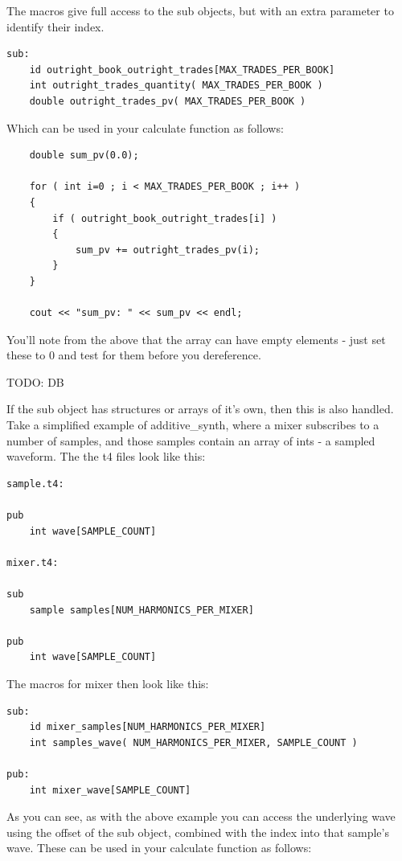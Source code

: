 \documentclass{report}
\begin{document}
The macros give full access to the sub objects, but with an extra parameter to identify their index.

\begin{verbatim}
sub:
    id outright_book_outright_trades[MAX_TRADES_PER_BOOK]
    int outright_trades_quantity( MAX_TRADES_PER_BOOK )
    double outright_trades_pv( MAX_TRADES_PER_BOOK )
\end{verbatim}

Which can be used in your calculate function as follows:

\begin{verbatim}
    double sum_pv(0.0);
    
    for ( int i=0 ; i < MAX_TRADES_PER_BOOK ; i++ )
    {
        if ( outright_book_outright_trades[i] )
        {
            sum_pv += outright_trades_pv(i);
        }
    }

    cout << "sum_pv: " << sum_pv << endl;
\end{verbatim}

You'll note from the above that the array can have empty elements - just set these to 0 and test for them before you dereference.

TODO: DB

If the sub object has structures or arrays of it's own, then this is also handled. Take a simplified example of additive_synth, where a mixer subscribes to a number of samples, and those samples contain an array of ints - a sampled waveform. The the t4 files look like this:


\begin{verbatim}
sample.t4:

pub
    int wave[SAMPLE_COUNT]

mixer.t4:

sub
    sample samples[NUM_HARMONICS_PER_MIXER]

pub
    int wave[SAMPLE_COUNT]
\end{verbatim}

The macros for mixer then look like this:

\begin{verbatim}
sub:
    id mixer_samples[NUM_HARMONICS_PER_MIXER]
    int samples_wave( NUM_HARMONICS_PER_MIXER, SAMPLE_COUNT )

pub:
    int mixer_wave[SAMPLE_COUNT]
\end{verbatim}

As you can see, as with the above example you can access the underlying wave using the offset of the sub object, combined with the index into that sample's wave. These can be used in your calculate function as follows:
\end{document}
